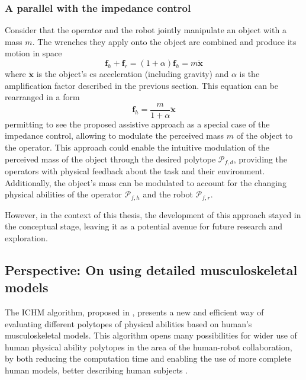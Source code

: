 \subsubsection*{A parallel with the impedance control}
Consider that the operator and the robot jointly manipulate an object with a mass $m$. The wrenches they apply onto the object are combined and produce its motion in space
\begin{equation}
    \bm{f}_h + \bm{f}_r = (1+\alpha)\bm{f}_h = m \ddot{\bm{x}}
\end{equation}
where $\ddot{\bm{x}}$ is the object's \gls{cs} acceleration (including gravity) and $\alpha$ is the amplification factor described in the previous section. This equation can be rearranged in a form
\begin{equation}
    \bm{f}_h = \frac{m}{1+\alpha} \ddot{\bm{x}}
\end{equation}
permitting to see the proposed assistive approach as a special case of the impedance control, allowing to modulate the perceived mass $m$ of the object to the operator. 
This approach could enable the intuitive modulation of the perceived mass of the object through the desired polytope $\mathcal{P}_{f,d}$, providing the operators with physical feedback about the task and their environment. Additionally, the object's mass can be modulated to account for the changing physical abilities of the operator $\mathcal{P}_{f,h}$ and the robot $\mathcal{P}_{f,r}$. 

However, in the context of this thesis, the development of this approach stayed in the conceptual stage, leaving it as a potential avenue for future research and exploration.


\subsection{Perspective: On using detailed musculoskeletal models}
\label{sec:human_robot_prospective}

The ICHM algorithm, proposed in , presents a new and efficient way of evaluating different polytopes of physical abilities based on human's musculoskeletal models. This algorithm opens many possibilities for wider use of human physical ability polytopes in the area of the human-robot collaboration, by both reducing the computation time and enabling the use of more complete human models, better describing human subjects \cite{sohn2019effects}. 

